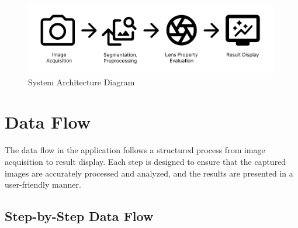 \begin{figure}[h]
\centering
\includegraphics[width=0.99\textwidth]{Images/architecture_diagram.png}
\caption{System Architecture Diagram}
\label{fig:system_architecture}
\end{figure}

\section{Data Flow}

The data flow in the application follows a structured process from image acquisition to result display. Each step is designed to ensure that the captured images are accurately processed and analyzed, and the results are presented in a user-friendly manner.

\subsection{Step-by-Step Data Flow}

